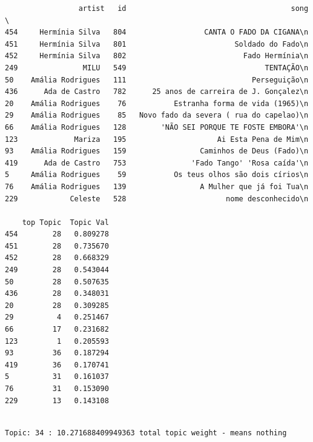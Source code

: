 \documentclass[11pt]{article}
\begin{document}
    
    \begin{verbatim}
                 artist   id                                      song  \
454     Hermínia Silva   804                  CANTA O FADO DA CIGANA\n   
451     Hermínia Silva   801                         Soldado do Fado\n   
452     Hermínia Silva   802                           Fado Hermínia\n   
249               MILU   549                                TENTAÇÃO\n   
50    Amália Rodrigues   111                             Perseguição\n   
436      Ada de Castro   782      25 anos de carreira de J. Gonçalez\n   
20    Amália Rodrigues    76           Estranha forma de vida (1965)\n   
29    Amália Rodrigues    85   Novo fado da severa ( rua do capelao)\n   
66    Amália Rodrigues   128        'NÃO SEI PORQUE TE FOSTE EMBORA'\n   
123             Mariza   195                     Ai Esta Pena de Mim\n   
93    Amália Rodrigues   159                 Caminhos de Deus (Fado)\n   
419      Ada de Castro   753               'Fado Tango' 'Rosa caída'\n   
5     Amália Rodrigues    59           Os teus olhos são dois círios\n   
76    Amália Rodrigues   139                 A Mulher que já foi Tua\n   
229            Celeste   528                       nome desconhecido\n   

    top Topic  Topic Val  
454        28   0.809278  
451        28   0.735670  
452        28   0.668329  
249        28   0.543044  
50         28   0.507635  
436        28   0.348031  
20         28   0.309285  
29          4   0.251467  
66         17   0.231682  
123         1   0.205593  
93         36   0.187294  
419        36   0.170741  
5          31   0.161037  
76         31   0.153090  
229        13   0.143108  
    \end{verbatim}

    
    \begin{Verbatim}[commandchars=\\\{\}]

Topic: 34 : 10.271688409949363 total topic weight - means nothing

    \end{Verbatim}
\end{document}
